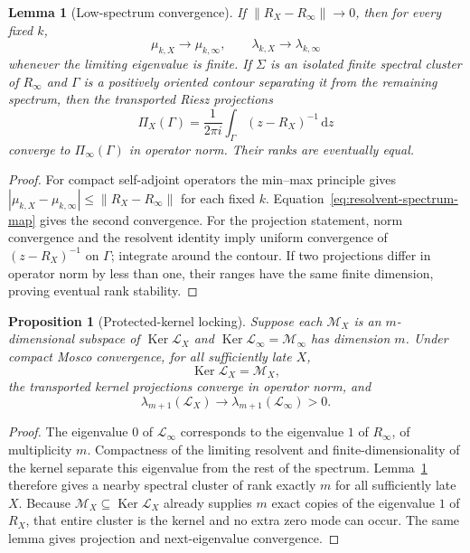\documentclass[11pt]{article}
\numberwithin{equation}{section}
\newtheorem{proposition}[theorem]{Proposition}
\newtheorem{lemma}[theorem]{Lemma}
\theoremstyle{definition}
\theoremstyle{remark}
\newcommand{\dd}{\mathrm d}
\newcommand{\Ker}{\operatorname{Ker}}
\newcommand{\norm}[1]{\lVert#1\rVert}
\newcommand{\M}{\mathcal M}
\begin{document}
\begin{lemma}[Low-spectrum convergence]
\label{lem:low-spectrum-convergence}
If $\norm{R_X-R_\infty}\to0$, then for every fixed $k$,
\begin{equation}
\mu_{k,X}\to\mu_{k,\infty},
\qquad
\lambda_{k,X}\to\lambda_{k,\infty}
\label{eq:low-spectrum-convergence}
\end{equation}
whenever the limiting eigenvalue is finite.  If $\Sigma$ is an isolated finite
spectral cluster of $R_\infty$ and $\Gamma$ is a positively oriented contour
separating it from the remaining spectrum, then the transported Riesz
projections
\begin{equation}
\Pi_X(\Gamma)
=\frac{1}{2\pi i}\int_\Gamma(z-R_X)^{-1}\,\dd z
\label{eq:riesz-projection}
\end{equation}
converge to $\Pi_\infty(\Gamma)$ in operator norm.  Their ranks are eventually
equal.
\end{lemma}

\begin{proof}
For compact self-adjoint operators the min--max principle gives
$|\mu_{k,X}-\mu_{k,\infty}|\le\norm{R_X-R_\infty}$ for each fixed $k$.
Equation~\eqref{eq:resolvent-spectrum-map} gives the second convergence.
For the projection statement, norm convergence and the resolvent identity
imply uniform convergence of $(z-R_X)^{-1}$ on $\Gamma$; integrate around the
contour.  If two projections differ in operator norm by less than one, their
ranges have the same finite dimension, proving eventual rank stability.
\end{proof}

\begin{proposition}[Protected-kernel locking]
\label{prop:protected-kernel-locking}
Suppose each $\M_X$ is an $m$-dimensional subspace of
$\Ker\mathscr L_X$ and
$\Ker\mathscr L_\infty=\M_\infty$ has dimension $m$.  Under compact Mosco
convergence, for all sufficiently late $X$,
\[
\Ker\mathscr L_X=\M_X,
\]
the transported kernel projections converge in operator norm, and
\[
\lambda_{m+1}(\mathscr L_X)
\to\lambda_{m+1}(\mathscr L_\infty)>0.
\]
\end{proposition}

\begin{proof}
The eigenvalue $0$ of $\mathscr L_\infty$ corresponds to the eigenvalue $1$
of $R_\infty$, of multiplicity $m$.  Compactness of the limiting resolvent and
finite-dimensionality of the kernel separate this eigenvalue from the rest of
the spectrum.  Lemma~\ref{lem:low-spectrum-convergence} therefore gives a
nearby spectral cluster of rank exactly $m$ for all sufficiently late $X$.
Because $\M_X\subseteq\Ker\mathscr L_X$ already supplies $m$ exact copies of
the eigenvalue $1$ of $R_X$, that entire cluster is the kernel and no extra
zero mode can occur.  The same lemma gives projection and next-eigenvalue
convergence.
\end{proof}
\end{document}
